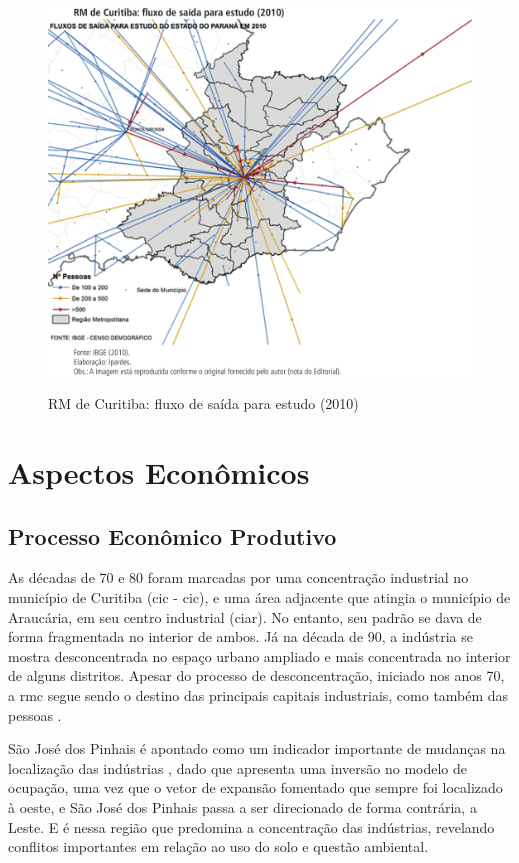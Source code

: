 	\begin{figure}
		\centering
		\caption{RM de Curitiba: fluxo de saída para estudo (2010)}
		\includegraphics[width=1.0\linewidth]{img/costa2015a_08}
		\label{fig:costa2015a_08}
	\end{figure}
	
	\section{Aspectos Econômicos}
	
	\subsection{Processo Econômico Produtivo}
	
	As décadas de 70 e 80 foram marcadas por uma concentração industrial no município de Curitiba (\glsdesc{cic} - \gls{cic}), e uma área adjacente que atingia o município de Araucária, em seu centro industrial (\gls{ciar}). No entanto, seu padrão se dava de forma fragmentada no interior de ambos. Já na década de 90, a indústria se mostra desconcentrada no espaço urbano ampliado e mais concentrada no interior de alguns distritos. Apesar do processo de desconcentração, iniciado nos anos 70, a \gls{rmc} segue sendo o destino das principais capitais industriais, como também das pessoas \cite{firkowski2002b}.
	
	São José dos Pinhais é apontado como um indicador importante de mudanças na localização das indústrias \cite{firkowski2002b}, dado que apresenta uma inversão no modelo de ocupação, uma vez que o vetor de expansão fomentado que sempre foi localizado à oeste, e São José dos Pinhais passa a ser direcionado de forma contrária, a Leste. E é nessa região que predomina a concentração das indústrias, revelando conflitos importantes em relação ao uso do solo e questão ambiental.

